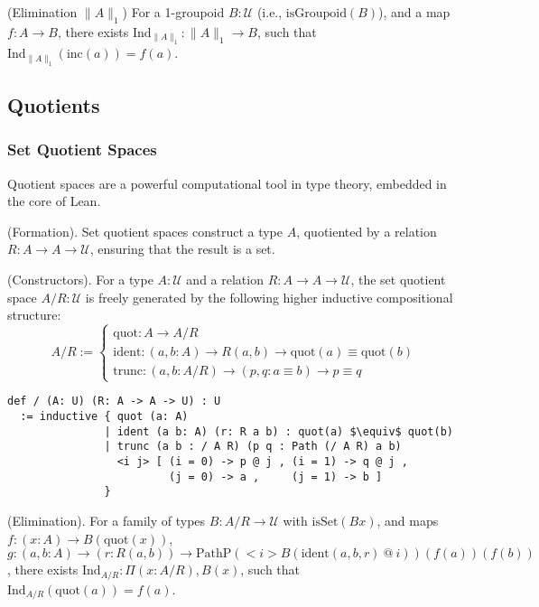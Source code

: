 \documentclass{article}
\begin{document}
\begin{theorem} (Elimination \( \| A \|_1 \))
For a 1-groupoid \( B : \mathcal{U} \) (i.e., \( \text{isGroupoid}(B) \)),
and a map \( f : A \to B \), there exists \( \text{Ind}_{\|A\|_1} : \|A\|_1 \to B \),
such that \( \text{Ind}_{\|A\|_1}(\text{inc}(a)) = f(a) \).
\end{theorem}

\newpage
\subsection{Quotients}
\subsubsection*{Set Quotient Spaces}
Quotient spaces are a powerful computational tool in type theory, embedded
in the core of Lean.
\begin{definition} (Formation).
Set quotient spaces construct a type \( A \), quotiented by
a relation \( R : A \to A \to \mathcal{U} \), ensuring that the result is a set.
\end{definition}

\begin{definition} (Constructors).
For a type \( A : \mathcal{U} \) and a relation \( R : A \to A \to \mathcal{U} \),
the set quotient space \( A / R : \mathcal{U} \) is freely generated by the following
higher inductive compositional structure:
\[
A / R :=
\begin{cases}
\text{quot} : A \to A / R \\
\text{ident} : (a, b : A) \to R(a,b) \to \text{quot}(a) \equiv \text{quot}(b) \\
\text{trunc} : (a, b : A / R) \to (p, q : a \equiv b) \to p \equiv q
\end{cases}
\]
\begin{lstlisting}[mathescape=true]
def / (A: U) (R: A -> A -> U) : U
  := inductive { quot (a: A)
               | ident (a b: A) (r: R a b) : quot(a) $\equiv$ quot(b)
               | trunc (a b : / A R) (p q : Path (/ A R) a b)
                 <i j> [ (i = 0) -> p @ j , (i = 1) -> q @ j ,
                         (j = 0) -> a ,     (j = 1) -> b ]
               }
\end{lstlisting}
\end{definition}

\begin{theorem} (Elimination).
For a family of types \( B : A/R \to \mathcal{U} \) with \( \text{isSet}(B x) \),
and maps \( f : (x : A) \to B(\text{quot}(x)) \),
\( g : (a, b : A) \to (r : R(a,b)) \to \text{PathP} (<i> B(\text{ident}(a,b,r)\ @\ i)) (f(a)) (f(b)) \),
there exists \( \text{Ind}_{A/R} : \Pi (x: A/R), B(x) \), such that \( \text{Ind}_{A/R}(\text{quot}(a)) = f(a) \).
\end{theorem}
\end{document}
